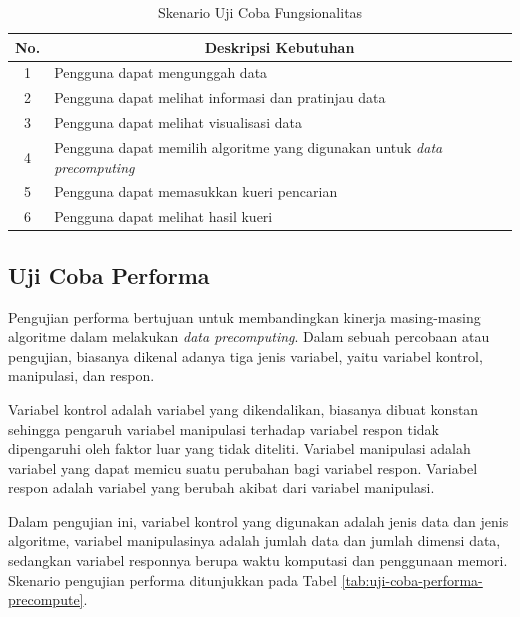 \begin{table}[H]
	\centering
	\begin{tabular}{ | c | p{8cm} | }
		\hline
		\multicolumn{1}{|c}{\textbf{No.}} & \multicolumn{1}{|c|}{\textbf{Deskripsi Kebutuhan}} \\ \hline \hline
		1 & Pengguna dapat mengunggah data \\ \hline
		2 & Pengguna dapat melihat informasi dan pratinjau data \\ \hline
		3 & Pengguna dapat melihat visualisasi data  \\ \hline
		4 & Pengguna dapat memilih algoritme yang digunakan untuk \textit{data precomputing}\\ \hline
		5 & Pengguna dapat memasukkan kueri pencarian \\ \hline
		6 & Pengguna dapat melihat hasil kueri \\ \hline
	\end{tabular} \caption{Skenario Uji Coba Fungsionalitas}
	\label{tab:uji-coba-fungsional}
\end{table}

\subsection{Uji Coba Performa}
\tab Pengujian performa bertujuan untuk membandingkan kinerja masing-masing algoritme dalam melakukan \textit{data precomputing}. Dalam sebuah percobaan atau pengujian, biasanya dikenal adanya tiga jenis variabel, yaitu variabel kontrol, manipulasi, dan respon. 

\pagebreak
Variabel kontrol adalah variabel yang dikendalikan, biasanya dibuat konstan sehingga pengaruh variabel manipulasi terhadap variabel respon tidak dipengaruhi oleh faktor luar yang tidak diteliti. Variabel manipulasi adalah variabel yang dapat memicu suatu perubahan bagi variabel respon. Variabel respon adalah variabel yang berubah akibat dari variabel manipulasi.

Dalam pengujian ini, variabel kontrol yang digunakan adalah jenis data dan jenis algoritme, variabel manipulasinya adalah jumlah data dan jumlah dimensi data, sedangkan variabel responnya berupa waktu komputasi dan penggunaan memori. Skenario pengujian performa ditunjukkan pada Tabel \ref{tab:uji-coba-performa-precompute}.

